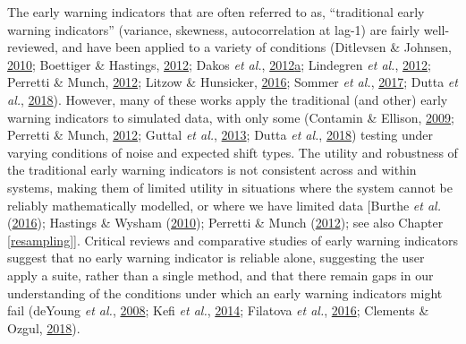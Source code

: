 \documentclass[12pt,twoside,openany]{reedthesis}
\begin{document}
The early warning indicators that are often referred to as, ``traditional early warning indicators'' (variance, skewness, autocorrelation at lag-1) are fairly well-reviewed, and have been applied to a variety of conditions (Ditlevsen \& Johnsen, \protect\hyperlink{ref-ditlevsen2010tipping}{2010}; Boettiger \& Hastings, \protect\hyperlink{ref-boettiger_quantifying_2012}{2012}; Dakos \emph{et al.}, \protect\hyperlink{ref-dakos2012methods}{2012}\protect\hyperlink{ref-dakos2012methods}{a}; Lindegren \emph{et al.}, \protect\hyperlink{ref-lindegren_early_2012}{2012}; Perretti \& Munch, \protect\hyperlink{ref-perretti2012regime}{2012}; Litzow \& Hunsicker, \protect\hyperlink{ref-litzow_early_2016}{2016}; Sommer \emph{et al.}, \protect\hyperlink{ref-sommer2017generic}{2017}; Dutta \emph{et al.}, \protect\hyperlink{ref-dutta2018robustness}{2018}). However, many of these works apply the traditional (and other) early warning indicators to simulated data, with only some (Contamin \& Ellison, \protect\hyperlink{ref-contamin_indicators_2009}{2009}; Perretti \& Munch, \protect\hyperlink{ref-perretti2012regime}{2012}; Guttal \emph{et al.}, \protect\hyperlink{ref-guttal2013robustness}{2013}; Dutta \emph{et al.}, \protect\hyperlink{ref-dutta2018robustness}{2018}) testing under varying conditions of noise and expected shift types. The utility and robustness of the traditional early warning indicators is not consistent across and within systems, making them of limited utility in situations where the system cannot be reliably mathematically modelled, or where we have limited data {[}Burthe \emph{et al.} (\protect\hyperlink{ref-burthe2016early}{2016}); Hastings \& Wysham (\protect\hyperlink{ref-hastings2010regime}{2010}); Perretti \& Munch (\protect\hyperlink{ref-perretti2012regime}{2012}); see also Chapter \ref{resampling}{]}. Critical reviews and comparative studies of early warning indicators suggest that no early warning indicator is reliable alone, suggesting the user apply a suite, rather than a single method, and that there remain gaps in our understanding of the conditions under which an early warning indicators might fail (deYoung \emph{et al.}, \protect\hyperlink{ref-deyoung_regime_2008}{2008}; Kefi \emph{et al.}, \protect\hyperlink{ref-kefi2014early}{2014}; Filatova \emph{et al.}, \protect\hyperlink{ref-filatova2016regime}{2016}; Clements \& Ozgul, \protect\hyperlink{ref-clements2018indicators}{2018}).
\end{document}
